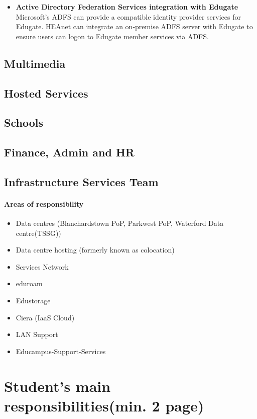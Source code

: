 \documentclass{article}
\begin{document}
\begin{itemize}
\begin{itemize}
\begin{itemize}
			\end{itemize}
			\item \textbf{Active Directory Federation Services integration with Edugate}\\
			Microsoft's ADFS can provide a compatible identity provider services for Edugate. HEAnet can integrate an on-premise ADFS server with Edugate to ensure users can logon to Edugate member services via ADFS.
		\end{itemize}
	\end{itemize}
	\subsection{Multimedia}
	\subsection{Hosted Services}
	\subsection{Schools}
	\subsection{Finance, Admin and HR}
	\subsection{Infrastructure Services Team}
	\paragraph{Areas of responsibility}
	\begin{itemize}
		\item Data centres (Blanchardstown PoP, Parkwest PoP, Waterford Data centre(TSSG))
		\item Data centre hosting (formerly known as colocation)
		\item Services Network
		\item eduroam
		\item Edustorage
		\item Ciera (IaaS Cloud)
		\item LAN Support
		\item Educampus-Support-Services
	\end{itemize}
	
	
	\newpage
	
	\section{Student's main responsibilities(min. 2 page)}
	
\end{document}
